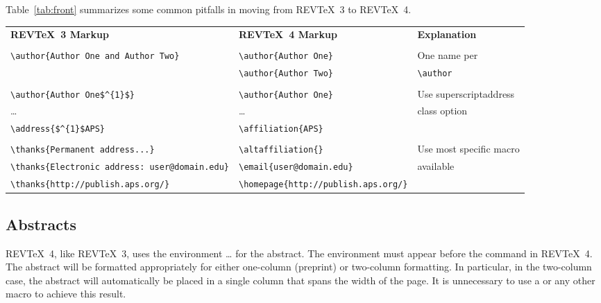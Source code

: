 \documentclass[%
,twocolumn%
,secnumarabic%
,amssymb,aps,prl,nobibnotes]{revtex4}
\makeatletter
\DeclareRobustCommand\classoption{\name@idx{document class option}}%
\def\name@idx#1#2{%
 {\ttfamily#2}%
 \index{#2\space#1=\string\ttt{#2}\space#1}\index{#1>#2=\string\ttt{#2}}%
}%
\DeclareRobustCommand\revtex{REV\TeX}
\makeatother
\begin{document}
Table~\ref{tab:front} summarizes some common pitfalls in moving from
\revtex~3 to \revtex~4.
\begin{table*}
\begin{ruledtabular}
\begin{tabular}{lll}
\textbf{\revtex~3 Markup} & \textbf{\revtex~4 Markup} & \textbf{Explanation}\\
& & \\
\verb+\author{Author One and Author Two}+ & \verb+\author{Author One}+ & One name per\\
& \verb+\author{Author Two}+  & \verb+\author+ \\
& & \\
\verb+\author{Author One$^{1}$}+ & \verb+\author{Author One}+& Use \classoption{superscriptaddress}\\
\dots &\dots &  class option \\
\verb+\address{$^{1}$APS}+ &\verb+\affiliation{APS}+ & \\
& & \\
\verb+\thanks{Permanent address...}+ & \verb+\altaffiliation{}+& Use most
specific macro \\
\verb+\thanks{Electronic address: user@domain.edu}+ &
\verb+\email{user@domain.edu}+& available\\
\verb+\thanks{http://publish.aps.org/}+ &
\verb+\homepage{http://publish.aps.org/}+& \\
\end{tabular}
\end{ruledtabular}
\caption{Common mistakes in marking up the front matter}
\label{tab:front}
\end{table*}


\subsection{Abstracts}
\revtex~4, like \revtex~3, uses the  environment
 \dots {} for the abstract. The
 environment must appear before the \cmd{\maketitle}
command in \revtex~4. The abstract will be formatted
appropriately for either one-column (preprint) or two-column
formatting. In particular, in the two-column case, the abstract will
automatically be placed in a single column that spans the width of the
page. It is unnecessary to use a \cmd{\minipage} or any other macro to
achieve this result.
\end{document}
